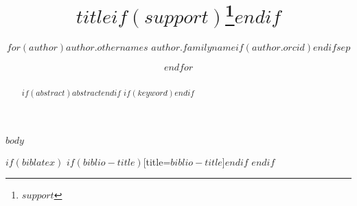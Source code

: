 \documentclass[runningheads]{llncs}
\title{$title$$if(support)$\thanks{$support$}$endif$}
\author{$for(author)$$author.othernames$ $author.familyname$\inst{$author.instno$}$if(author.orcid)$\orcidID{$author.orcid$}$endif$$sep$ \and $endfor$}
\institute{$for(author)$$author.institute$$if(author.email)$\\\email{$author.email$}\\$endif$$sep$ \and $endfor$}
\begin{document}
%
\maketitle              %
%
\begin{abstract}
$if(abstract)$$abstract$$endif$
$if(keyword)$$endif$
\end{abstract}

$body$

$if(biblatex)$
\printbibliography$if(biblio-title)$[title=$biblio-title$]$endif$
$endif$
\end{document}
